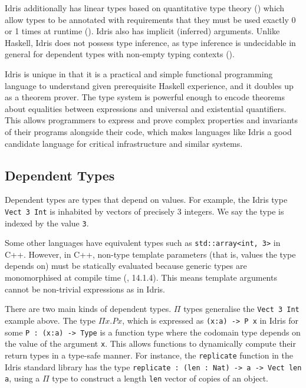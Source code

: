 \documentclass[11pt]{report}
\begin{document}
\begin{spacing}{1.15}
Idris additionally has linear types based on quantitative type theory (\cite{atkey2018syntax}) which allow types to be annotated with requirements that they must be used exactly 0 or 1 times at runtime (\cite{brady2021qtt}). Idris also has implicit (inferred) arguments. Unlike Haskell, Idris does not possess type inference, as type inference is undecidable in general for dependent types with non-empty typing contexts (\cite{dowek1993undecidability}). %

Idris is unique in that it is a practical and simple functional programming language to understand given prerequisite Haskell experience, and it doubles up as a theorem prover. The type system is powerful enough to encode theorems about equalities between expressions and universal and existential quantifiers. This allows programmers to express and prove complex properties and invariants of their programs alongside their code, which makes languages like Idris a good candidate language for critical infrastructure and similar systems.

\subsection{Dependent Types}

Dependent types are types that depend on values. For example, the Idris type \texttt{Vect 3 Int} is inhabited by vectors of precisely 3 integers. We say the type is indexed by the value \texttt{3}.

Some other languages have equivalent types such as \texttt{std::array<int, 3>} in C++. However, in C++, non-type template parameters (that is, values the type depends on) must be statically evaluated because generic types are monomorphised at compile time (\cite{ISO:CPP}, 14.1.4). This means template arguments cannot be non-trivial expressions as in Idris.

There are two main kinds of dependent types. $\Pi$ types generalise the \texttt{Vect 3 Int} example above. The type $\Pi x.Px$, which is expressed as \texttt{(x:a) -> P x} in Idris for some \texttt{P : (x:a) -> Type} is a function type where the codomain type depends on the value of the argument \texttt{x}. This allows functions to dynamically compute their return types in a type-safe manner. For instance, the \texttt{replicate} function in the Idris standard library has the type \texttt{replicate : (len : Nat) -> a -> Vect len a}, using a $\Pi$ type to construct a length \texttt{len} vector of copies of an object.


\end{spacing}
\end{document}
